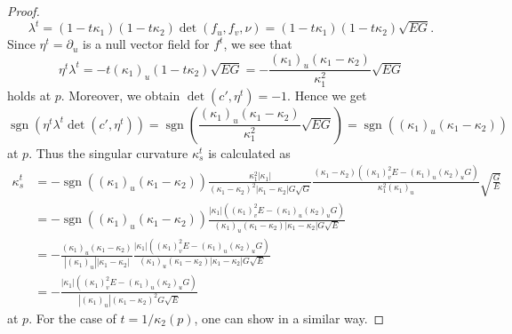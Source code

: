 \documentclass[10pt,a4paper]{amsart}
\newcommand{\sgn}{\operatorname{sgn}}
\begin{document}
\begin{proof}
	\[
	\lambda^t=(1-t\kappa_1)(1-t\kappa_2)\det(f_u,f_v,\nu)
	=(1-t\kappa_1)(1-t\kappa_2)\sqrt{EG}.
	\]
	Since $\eta^t=\partial_u$ is a null vector field for $f^t$, 
	we see that 
	\[
	\eta^t\lambda^t=-t(\kappa_1)_u(1-t\kappa_2)\sqrt{EG}
	=-\frac{(\kappa_1)_u(\kappa_1-\kappa_2)}{\kappa_1^2}\sqrt{EG}
	\]
	holds at $p$. 
	Moreover, we obtain $\det(c',\eta^t)=-1$. 
	Hence we get 
	\[
	\sgn(\eta^t\lambda^t\det(c',\eta^t))
	=\sgn\left(\frac{(\kappa_1)_u(\kappa_1-\kappa_2)}{\kappa_1^2}\sqrt{EG}\right)
	=\sgn((\kappa_1)_u(\kappa_1-\kappa_2))
	\]
	at $p$. 
	Thus the singular curvature $\kappa_s^t$ is calculated as 
	\[
	\begin{aligned}
		\kappa_s^t&=-\sgn((\kappa_1)_u(\kappa_1-\kappa_2))
		\frac{\kappa_1^2|\kappa_1|}{(\kappa_1-\kappa_2)^2|\kappa_1-\kappa_2|G\sqrt{G}}
		\frac{(\kappa_1-\kappa_2)((\kappa_1)_v^2E-(\kappa_1)_u(\kappa_2)_uG)}
		{\kappa_1^2(\kappa_1)_u}\sqrt{\frac{G}{E}}\\
		&=-\sgn((\kappa_1)_u(\kappa_1-\kappa_2))
		\frac{|\kappa_1|((\kappa_1)_v^2E-(\kappa_1)_u(\kappa_2)_uG)}
		{(\kappa_1)_u(\kappa_1-\kappa_2)|\kappa_1-\kappa_2|G\sqrt{E}}\\
		&=-\frac{(\kappa_1)_u(\kappa_1-\kappa_2)}{|(\kappa_1)_u||\kappa_1-\kappa_2|}
		\frac{|\kappa_1|((\kappa_1)_v^2E-(\kappa_1)_u(\kappa_2)_uG)}
		{(\kappa_1)_u(\kappa_1-\kappa_2)|\kappa_1-\kappa_2|G\sqrt{E}}\\
		&=-\frac{|\kappa_1|((\kappa_1)_v^2E-(\kappa_1)_u(\kappa_2)_uG)}
		{|(\kappa_1)_u|(\kappa_1-\kappa_2)^2G\sqrt{E}}
	\end{aligned}
	\]
	at $p$. 
	For the case of $t=1/\kappa_2(p)$, 
	one can show in a similar way.
\end{proof}
\end{document}
